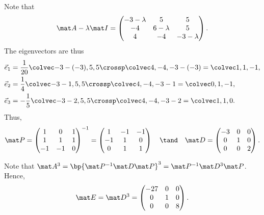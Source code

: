 \begin{solution}
    Note that \[\mat A - \l \mat I = \begin{pmatrix}-3-\l & 5 & 5 \\ -4 & 6-\l & 5 \\ 4 & -4 & -3-\l\end{pmatrix}.\] The eigenvectors are thus
    \begin{align*}
        \vec e_1 &= \frac1{20} \cveciii{-3-(-3)}55 \crossp \cveciii4{-4}{-3-(-3)} = \cveciii11{-1},\\
        \vec e_2 &= \frac1{4} \cveciii{-3-1}55 \crossp \cveciii4{-4}{-3-1} = \cveciii01{-1},\\
        \vec e_3 &= -\frac1{5} \cveciii{-3-2}55 \crossp \cveciii4{-4}{-3-2} = \cveciii110.
    \end{align*}
    Thus, \[\mat P = \begin{pmatrix}1 & 0 & 1 \\ 1 & 1 & 1 \\ -1 & -1 & 0\end{pmatrix}^{-1} = \begin{pmatrix}1 & -1 & -1 \\ -1 & 1 & 0 \\ 0 & 1 & 1\end{pmatrix} \quad \tand \quad \mat D = \begin{pmatrix}-3 & 0 & 0 \\ 0 & 1 & 0 \\ 0 & 0 & 2\end{pmatrix}.\]

    Note that $\mat A^3 = \bp{\mat P^{-1} \mat D \mat P}^3 = \mat P^{-1} \mat D^3 \mat P$. Hence, \[\mat E = \mat D^3 = \begin{pmatrix}-27 & 0 & 0 \\ 0 & 1 & 0 \\ 0 & 0 & 8\end{pmatrix}.\]
\end{solution}

